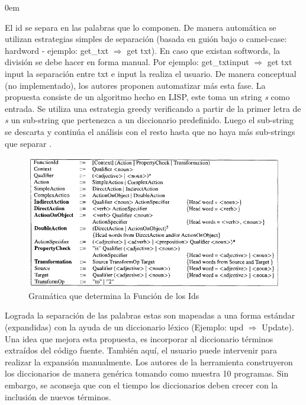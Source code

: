 \begin{description}
\itemsep0em%
\item[Segmentation:] El id se separa en las palabras que lo componen. De manera automática se utilizan estrategias simples de separación (basada en guión bajo o camel-case: hardword - ejemplo: \textsf{get\_txt} $\Rightarrow$ \textsf{get txt}). En caso que existan softwords, la división se debe hacer en forma manual. Por ejemplo: \textsf{get\_txtinput} $\Rightarrow$ \textsf{get txt input} la separación entre \textsf{txt} e \textsf{input} la realiza el usuario. De manera conceptual (no implementado), los autores proponen automatizar más esta fase. La propuesta consiste de un algoritmo hecho en LISP, este toma un string \textit{s} como entrada. Se utiliza una estrategia greedy verificando a partir de la primer letra de \textit{s} un sub-string que pertenezca a un diccionario predefinido. Luego el sub-string se descarta y continúa el análisis con el resto hasta que no haya más sub-strings que separar \cite{BCPT99}.

\begin{figure}[h] %
\centerline{%
\includegraphics[scale= 0.60]{./cap3/ire_3.png}
}
\caption{Gramática que determina la Función de los Ids}
\label{ire3}
\end{figure}

\item[Standard Lexicon:] Lograda la separación de las palabras estas son mapeadas a una forma estándar (expandidas) con la ayuda de un diccionario léxico \cite{BCPT99} (Ejemplo: \textsf{upd} $\Rightarrow$ \textsf{Update}). Una idea que mejora esta propuesta, es incorporar al diccionario términos extraídos del código fuente. También aquí, el usuario puede intervenir para realizar la expansión manualmente. Los autores \cite{BCPT00} de la herramienta construyeron los diccionarios de manera genérica tomando como muestra 10 programas. Sin embargo, se aconseja que con el tiempo los diccionarios deben crecer con la inclusión de nuevos términos.


\end{description}
